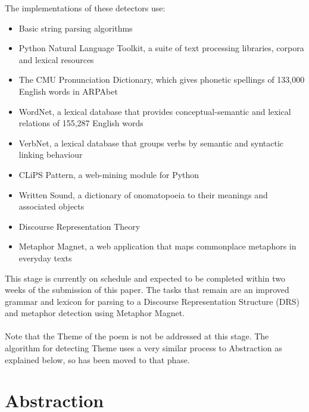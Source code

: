 The implementations of these detectors use:
\begin{itemize}
\setlength{\itemsep}{0pt}
\item{Basic string parsing algorithms}
\item{Python Natural Language Toolkit, a suite of text processing libraries, corpora and lexical resources}
\item{The CMU Pronunciation Dictionary, which gives phonetic spellings of 133,000 English words in ARPAbet}
\item{WordNet, a lexical database that provides conceptual-semantic and lexical relations of 155,287 English words}
\item{VerbNet, a lexical database that groups verbs by semantic and syntactic linking behaviour}
\item{CLiPS Pattern, a web-mining module for Python}
\item{Written Sound, a dictionary of onomatopoeia to their meanings and associated objects}
\item{Discourse Representation Theory}
\item{Metaphor Magnet, a web application that maps commonplace metaphors in everyday texts}
\end{itemize}

This stage is currently on schedule and expected to be completed within two weeks of the submission of this paper. The tasks that remain are an improved grammar and lexicon for parsing to a Discourse Representation Structure (DRS) and metaphor detection using Metaphor Magnet.
\\\\
Note that the Theme of the poem is not be addressed at this stage. The algorithm for detecting Theme uses a very similar process to Abstraction as explained below, so has been moved to that phase.

\section{Abstraction}

